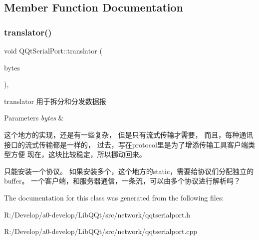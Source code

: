 \subsection{Member Function Documentation}
\mbox{\label{class_q_qt_serial_port_a7d3e84dbed9a0b874a0a8af849b0a9de}} 
\subsubsection{\texorpdfstring{translator()}{translator()}}
{\footnotesize\ttfamily void Q\+Qt\+Serial\+Port\+::translator (\begin{DoxyParamCaption}\item[{const Q\+Byte\+Array \&}]{bytes }\end{DoxyParamCaption})\hspace{0.3cm}{\ttfamily [protected]}, {\ttfamily [virtual]}}



translator 用于拆分和分发数据报 


\begin{DoxyParams}{Parameters}
{\em bytes} & \\
\hline
\end{DoxyParams}
这个地方的实现，还是有一些复杂， 但是只有流式传输才需要， 而且，每种通讯接口的流式传输都是一样的， 过去，写在protocol里是为了增添传输工具客户端类型方便 现在，这块比较稳定，所以挪动回来。

只能安装一个协议。 如果安装多个，这个地方的static，需要给协议们分配独立的buffer。 一个客户端，和服务器通信，一条流，可以由多个协议进行解析吗？

The documentation for this class was generated from the following files\+:\begin{DoxyCompactItemize}
\item 
R\+:/\+Develop/a0-\/develop/\+Lib\+Q\+Qt/src/network/qqtserialport.\+h\item 
R\+:/\+Develop/a0-\/develop/\+Lib\+Q\+Qt/src/network/qqtserialport.\+cpp\end{DoxyCompactItemize}
